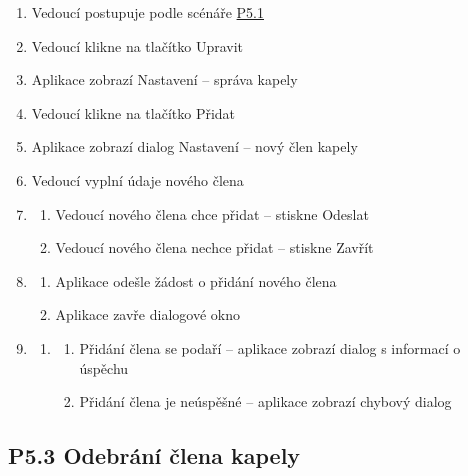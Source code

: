 \begin{enumerate}
    \item Vedoucí postupuje podle scénáře \hyperref[P5.1]{P5.1}
    \item Vedoucí klikne na tlačítko Upravit
    \item Aplikace zobrazí Nastavení -- správa kapely
    \item Vedoucí klikne na tlačítko Přidat
    \item Aplikace zobrazí dialog Nastavení -- nový člen kapely
    \item Vedoucí vyplní údaje nového člena
    \item \begin{enumerate}
        \item Vedoucí nového člena chce přidat -- stiskne Odeslat
        \item Vedoucí nového člena nechce přidat -- stiskne Zavřít
    \end{enumerate}
    \item \begin{enumerate}
        \item Aplikace odešle žádost o přidání nového člena
        \item Aplikace zavře dialogové okno
    \end{enumerate}
    \item \begin{enumerate}
        \item \begin{enumerate}
            \item Přidání člena se podaří -- aplikace zobrazí dialog s informací o úspěchu
            \item Přidání člena je neúspěšné -- aplikace zobrazí chybový dialog
        \end{enumerate}
    \end{enumerate}
\end{enumerate}

\subsection{P5.3 Odebrání člena kapely}
\label{P5.3}

